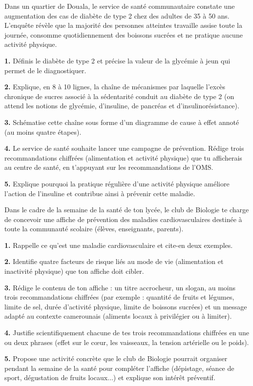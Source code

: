 \documentclass[11pt]{article}
\begin{document}
\begin{exercice}
Dans un quartier de Douala, le service de santé communautaire constate une augmentation des cas de diabète de type 2 chez des adultes de 35 à 50 ans. L'enquête révèle que la majorité des personnes atteintes travaille assise toute la journée, consomme quotidiennement des boissons sucrées et ne pratique aucune activité physique.

\textbf{1.} Définis le diabète de type 2 et précise la valeur de la glycémie à jeun qui permet de le diagnostiquer.

\textbf{2.} Explique, en 8 à 10 lignes, la chaîne de mécanismes par laquelle l'excès chronique de sucres associé à la sédentarité conduit au diabète de type 2 (on attend les notions de glycémie, d'insuline, de pancréas et d'insulinorésistance).

\textbf{3.} Schématise cette chaîne sous forme d'un diagramme de cause à effet annoté (au moins quatre étapes).

\textbf{4.} Le service de santé souhaite lancer une campagne de prévention. Rédige trois recommandations chiffrées (alimentation et activité physique) que tu afficherais au centre de santé, en t'appuyant sur les recommandations de l'OMS.

\textbf{5.} Explique pourquoi la pratique régulière d'une activité physique améliore l'action de l'insuline et contribue ainsi à prévenir cette maladie.
\end{exercice}

\begin{exercice}
Dans le cadre de la semaine de la santé de ton lycée, le club de Biologie te charge de concevoir une affiche de prévention des maladies cardiovasculaires destinée à toute la communauté scolaire (élèves, enseignants, parents).

\textbf{1.} Rappelle ce qu'est une maladie cardiovasculaire et cite-en deux exemples.

\textbf{2.} Identifie quatre facteurs de risque liés au mode de vie (alimentation et inactivité physique) que ton affiche doit cibler.

\textbf{3.} Rédige le contenu de ton affiche : un titre accrocheur, un slogan, au moins trois recommandations chiffrées (par exemple : quantité de fruits et légumes, limite de sel, durée d'activité physique, limite de boissons sucrées) et un message adapté au contexte camerounais (aliments locaux à privilégier ou à limiter).

\textbf{4.} Justifie scientifiquement chacune de tes trois recommandations chiffrées en une ou deux phrases (effet sur le cœur, les vaisseaux, la tension artérielle ou le poids).

\textbf{5.} Propose une activité concrète que le club de Biologie pourrait organiser pendant la semaine de la santé pour compléter l'affiche (dépistage, séance de sport, dégustation de fruits locaux...) et explique son intérêt préventif.
\end{exercice}
\end{document}
